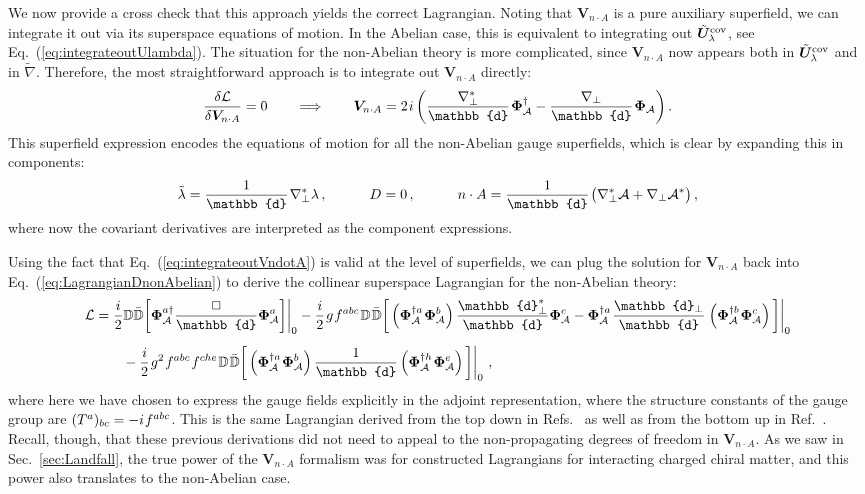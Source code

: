 \documentclass[12pt,document,nofootinbib,superscriptaddress,onecolumn,preprintnumbers,balancelastpage]{article}
\newcommand{\s}{\hspace{0.8pt}}
\newcommand{\PP}{\mathbb{d}}
\DeclareRobustCommand{\Sec}[1]{Sec.~\ref{#1}}
\DeclareRobustCommand{\Eq}[1]{Eq.~(\ref{#1})}
\DeclareRobustCommand{\Ref}[1]{Ref.~\cite{#1}}
\DeclareRobustCommand{\Refs}[1]{Refs.~\cite{#1}}
\newcommand{\bPhiA}{ \boldsymbol{\Phi}_\alc}
\newcommand{\bD}{ \boldsymbol{V}_{n \cdot A}}
\newcommand{\bPhialc}{ \boldsymbol{\Phi}_\alc}
\newcommand{\bU}{ \tilde{\boldsymbol U}}
\newcommand{\D}{\mathbb{D}}
\newcommand{\alc}{\mathcal{A}}
\begin{document}
\begin{spacing}{1.2}
We now provide a cross check that this approach yields the correct Lagrangian.
%
Noting that $\bD$ is a pure auxiliary superfield, we can integrate it out via its superspace equations of motion.
%
In the Abelian case, this is equivalent to integrating out $\bU^{\rm cov}_\lambda$,  see \Eq{eq:integrateoutUlambda}.
%
The situation for the non-Abelian theory is more complicated, since $\bD$ now appears both in $\bU^{\rm cov}_\lambda$ and in $\tilde{\nabla}$. 
%
Therefore, the most straightforward approach is to integrate out $\bD$ directly:
\begin{equation}
\label{eq:integrateoutVndotA}
 \frac{\delta \mathcal{L}}{\delta \bD} = 0 \qquad \Longrightarrow \qquad \bD = 2\s i\, \bigg(\frac{\nabla_\perp^*}{\PP}\s \bPhialc^\dagger - \frac{\nabla_\perp}{\PP} \s\bPhialc \bigg)  \,.
\end{equation}
%
This superfield expression encodes the equations of motion for all the non-Abelian gauge superfields, which is clear by expanding this in components:
%
\begin{equation}
\tilde{\lambda} = \frac{1}{\PP}\s \nabla_\perp^* \lambda \,, \qquad\quad
D =  0\,, \qquad\quad
n\cdot A = \frac{1}{\PP}\s \big(\nabla_\perp^* \alc + \nabla_\perp \alc^*\big) \,,
\end{equation}
%
where now the covariant derivatives are interpreted as the component expressions.



Using the fact that \Eq{eq:integrateoutVndotA} is valid at the level of superfields, we can plug the solution for $\bD$ back into \Eq{eq:LagrangianDnonAbelian} to derive the collinear superspace Lagrangian for the non-Abelian theory:  
%
\begin{align}
\label{eq:nonablianLExpanded}
\mathcal{L}
&= \frac{i}{2}\D \bar{\D} \bigg[ \bPhiA^{a \dagger} \frac{\Box}{\PP} \bPhiA^a  \bigg] \bigg|_0 - \frac{i}{2}\s g\s f^{abc}\s \D\s \bar{\D} \bigg[  \left(\bPhiA^{\dagger a}\s \bPhiA^b\right) \frac{\PP_\perp^*}{\PP} \bPhiA^c - \bPhiA^{\dagger a}\s \frac{\PP_\perp}{\PP}\s \left(\bPhiA^{\dagger b}\s \bPhiA^c  \right) \bigg] \bigg|_0 \notag \\[5pt] 
& \qquad - \frac{i}{2} \s g^2\s f^{abc}\s f^{che}\s \D \s \bar{\D} \bigg[  \left(\bPhiA^{\dagger a}\s \bPhiA^b\right) \frac{1}{\PP} \left( \bPhiA^{\dagger h}\s \bPhiA^e \right) \bigg] \bigg|_0  \,\,,
\end{align}
%
where here we have chosen to express the gauge fields explicitly in the adjoint representation, where the structure constants of the gauge group are $(T^a)_{bc} = - i\s f^{abc}$. 
%
This is the same Lagrangian derived from the top down in \Refs{Cohen:2016dcl,Cohen:2016jzp} as well as from the bottom up in \Ref{Cohen:2018qvn}.
%
Recall, though, that these previous derivations did not need to appeal to the non-propagating degrees of freedom in $\bD$.
%
As we saw in \Sec{sec:Landfall}, the true power of the $\bD$ formalism was for constructed Lagrangians for interacting charged chiral matter, and this power also translates to the non-Abelian case. 

\end{spacing}

\begin{spacing}{1.1}
% 


\end{spacing}
\end{document}

